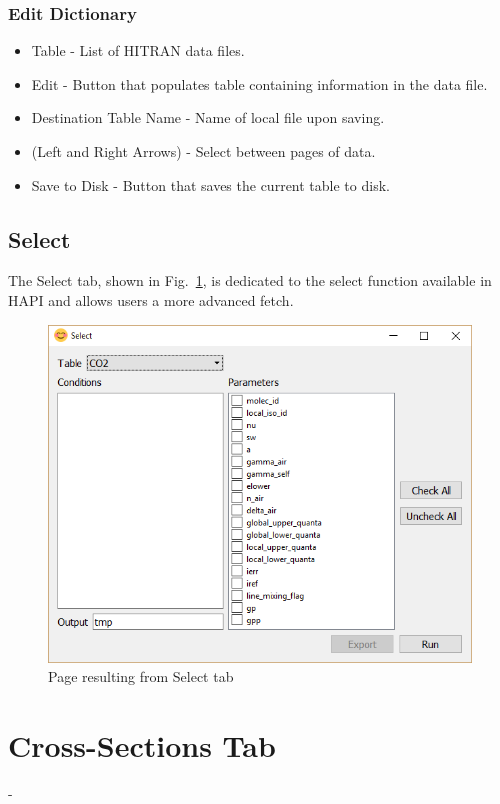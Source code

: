 \documentclass[12pt]{article}
\begin{document}
\subsubsection*{Edit Dictionary}
\begin{itemize}
\item Table - List of HITRAN data files.
\item Edit - Button that populates table containing information in the data file.
\item Destination Table Name - Name of local file upon saving.
\item (Left and Right Arrows) - Select between pages of data.
\item Save to Disk - Button that saves the  current table to disk.
\end{itemize}
\newpage


\subsection{Select}
The Select tab, shown in Fig.~\ref{fig:select}, is dedicated to the select function available in HAPI and allows users a more advanced fetch.
\begin{figure}[h]
\centering
\includegraphics[scale = 0.6]{select_window}
\caption{Page resulting from Select tab}
\label{fig:select}
\end{figure}

\section{Cross-Sections Tab}
-
\end{document}
